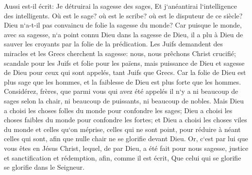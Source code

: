 \verse Aussi est-il écrit: Je détruirai la sagesse des sages, Et j`anéantirai l`intelligence des intelligents. 
\verse Où est le sage? où est le scribe? où est le disputeur de ce siècle? Dieu n`a-t-il pas convaincu de folie la sagesse du monde? 
\verse Car puisque le monde, avec sa sagesse, n`a point connu Dieu dans la sagesse de Dieu, il a plu à Dieu de sauver les croyants par la folie de la prédication. 
\verse Les Juifs demandent des miracles et les Grecs cherchent la sagesse: 
\verse nous, nous prêchons Christ crucifié; scandale pour les Juifs et folie pour les païens, 
\verse mais puissance de Dieu et sagesse de Dieu pour ceux qui sont appelés, tant Juifs que Grecs. 
\verse Car la folie de Dieu est plus sage que les hommes, et la faiblesse de Dieu est plus forte que les hommes. 
\verse Considérez, frères, que parmi vous qui avez été appelés il n`y a ni beaucoup de sages selon la chair, ni beaucoup de puissants, ni beaucoup de nobles. 
\verse Mais Dieu a choisi les choses folles du monde pour confondre les sages; Dieu a choisi les choses faibles du monde pour confondre les fortes; 
\verse et Dieu a choisi les choses viles du monde et celles qu`on méprise, celles qui ne sont point, pour réduire à néant celles qui sont, 
\verse afin que nulle chair ne se glorifie devant Dieu. 
\verse Or, c`est par lui que vous êtes en Jésus Christ, lequel, de par Dieu, a été fait pour nous sagesse, justice et sanctification et rédemption, 
\verse afin, comme il est écrit, Que celui qui se glorifie se glorifie dans le Seigneur. 

\chapter{}

